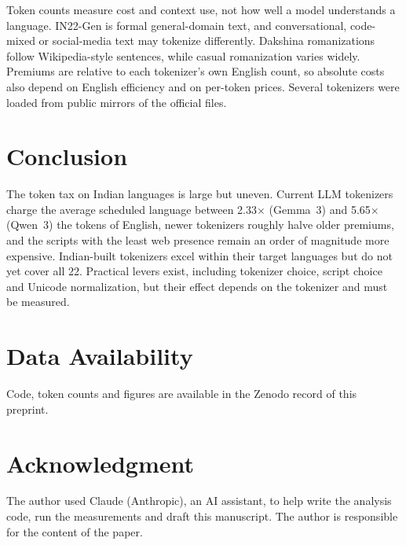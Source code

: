 \documentclass[conference]{IEEEtran}
\begin{document}
Token counts measure cost and context use, not how well a model understands a language. IN22-Gen is formal general-domain text, and conversational, code-mixed or social-media text may tokenize differently. Dakshina romanizations follow Wikipedia-style sentences, while casual romanization varies widely. Premiums are relative to each tokenizer's own English count, so absolute costs also depend on English efficiency and on per-token prices. Several tokenizers were loaded from public mirrors of the official files.

\section{Conclusion}
The token tax on Indian languages is large but uneven. Current LLM tokenizers charge the average scheduled language between 2.33$\times$ (Gemma~3) and 5.65$\times$ (Qwen~3) the tokens of English, newer tokenizers roughly halve older premiums, and the scripts with the least web presence remain an order of magnitude more expensive. Indian-built tokenizers excel within their target languages but do not yet cover all 22. Practical levers exist, including tokenizer choice, script choice and Unicode normalization, but their effect depends on the tokenizer and must be measured.

\section*{Data Availability}
Code, token counts and figures are available in the Zenodo record of this preprint.

\section*{Acknowledgment}
The author used Claude (Anthropic), an AI assistant, to help write the analysis code, run the measurements and draft this manuscript. The author is responsible for the content of the paper.



\end{document}

